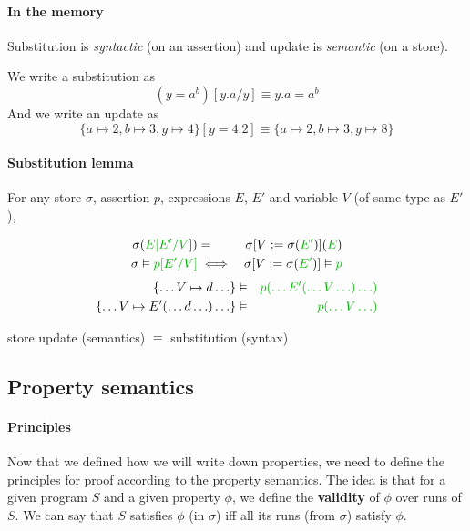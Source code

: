 \documentclass[12pt, a4paper]{book}
\begin{document}
\paragraph{In the memory} Substitution is \textit{syntactic} (on an assertion)
and update is \textit{semantic} (on a store).

We write a substitution as
$$
(y=a^{b})[y.a/y] \equiv y . a = a^{b}
$$
And we write an update as
$$
\{a \mapsto 2, b \mapsto 3, y\mapsto 4\}[y=4.2] \equiv \{a \mapsto 2, b \mapsto 3, y\mapsto 8\}
$$

\paragraph{Substitution lemma}

For any store $\sigma$, assertion $p$, expressions $E$, $E'$ and variable $V$
(of same type as $E'$),

\begin{eqnarray*}
    \sigma(\textcolor{green!70!black}{E[E'/V}]) & = & \sigma[V:=\sigma(\textcolor{green!70!black}{E'})](\textcolor{green!70!black}{E}) \\
    \sigma \vDash \textcolor{green!70!black}{p[E'/V]} & \iff & \sigma[V:=\sigma(\textcolor{green!70!black}{E'})] \vDash \textcolor{green!70!black}{p}
\end{eqnarray*}
\begin{eqnarray*}
    \{\ldots V \mapsto d \ldots\} & \vDash & \textcolor{green!70!black}{p(\ldots E'(\ldots V \ldots) \ldots)} \\
    \{\ldots V \mapsto E' (\ldots d\ldots) \ldots\} & \vDash & \textcolor{green!70!black}{p(\ldots V\ldots)}
\end{eqnarray*}

store update (semantics) $\equiv$ \textcolor{green!70!black}{substitution (syntax)}

\subsection{Property semantics}
\label{sub:Property semantics}

\paragraph{Principles} Now that we defined how we will write down properties, we
need to define the principles for proof according to the property semantics. The
idea is that for a given program $S$ and a given property $\phi$, we define
the \textbf{validity} of $\phi$ over runs of $S$. We can say that $S$ satisfies
$\phi$ (in $\sigma$) iff all its runs (from $\sigma$) satisfy $\phi$. \newline
\end{document}
